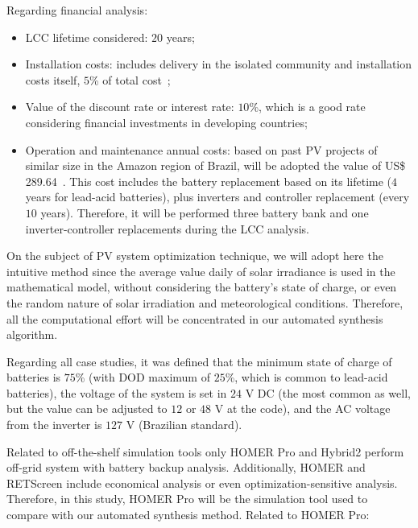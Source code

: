 \documentclass[review]{elsarticle}
\begin{document}
Regarding financial analysis:
\begin{itemize}
	\item LCC lifetime considered: $20$ years;
	\item Installation costs: includes delivery in the isolated community and installation costs itself, $5$\% of total cost~\cite{Agrener2013};
	\item Value of the discount rate or interest rate: $10$\%, which is a good rate considering financial investments in developing countries;
	\item Operation and maintenance annual costs: based on past PV projects of similar size in the Amazon region of Brazil, will be adopted the value of US\$ 289.64~\citep{Agrener2013}. This cost includes the battery replacement based on its lifetime ($4$ years for lead-acid batteries), plus inverters and controller replacement (every $10$ years). Therefore, it will be performed three battery bank and one inverter-controller replacements during the LCC analysis.
\end{itemize}

On the subject of PV system optimization technique, we will adopt here the intuitive method 
since the average value daily of solar irradiance is used in the mathematical model, 
without considering the battery's state of charge, or even the random nature 
of solar irradiation and meteorological conditions. Therefore, all the computational 
effort will be concentrated in our automated synthesis algorithm.

Regarding all case studies, it was defined that the minimum state of charge of batteries is $75$\% (with DOD maximum of $25$\%, which is common to lead-acid batteries), the voltage of the system is set in $24$ V DC (the most common as well, but the value can be adjusted to $12$ or $48$ V at the code), and the AC voltage from the inverter is $127$ V (Brazilian standard).

Related to off-the-shelf simulation tools only HOMER Pro and Hybrid2 perform off-grid system with battery backup analysis. Additionally, HOMER and RETScreen include economical analysis or even optimization-sensitive analysis. Therefore, in this study, HOMER Pro will be the simulation tool used to compare with our automated synthesis method.  Related to HOMER Pro:
\end{document}
